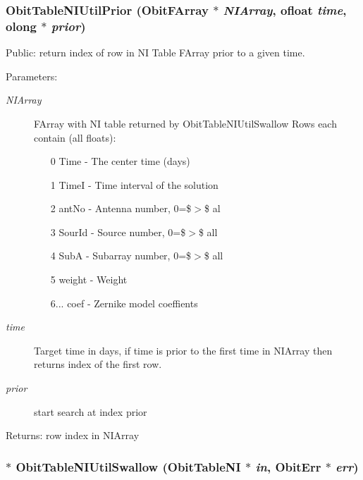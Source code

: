 \subsubsection{ Obit\-Table\-NIUtil\-Prior ({\bf Obit\-FArray} $\ast$ {\em NIArray}, {\bf ofloat} {\em time}, {\bf olong} $\ast$ {\em prior})}\label{ObitTableNIUtil_8c_a1}


Public: return index of row in NI Table FArray prior to a given time. 

\begin{Desc}
\item[Parameters:]
\begin{description}
\item[{\em NIArray}]FArray with NI table returned by Obit\-Table\-NIUtil\-Swallow Rows each contain (all floats): \begin{itemize}
\item [0] Time - The center time (days) \item [1] Time\-I - Time interval of the solution \item [2] ant\-No - Antenna number, 0=\$$>$\$ al \item [3] Sour\-Id - Source number, 0=\$$>$\$ all \item [4] Sub\-A - Subarray number, 0=\$$>$\$ all \item [5] weight - Weight \item [6...] coef - Zernike model coeffients \end{itemize}
\item[{\em time}]Target time in days, if time is prior to the first time in NIArray then returns index of the first row. \item[{\em prior}]start search at index prior \end{description}
\end{Desc}
\begin{Desc}
\item[Returns:]row index in NIArray \end{Desc}
\subsubsection{$\ast$ Obit\-Table\-NIUtil\-Swallow ({\bf Obit\-Table\-NI} $\ast$ {\em in}, {\bf Obit\-Err} $\ast$ {\em err})}\label{ObitTableNIUtil_8c_a0}


